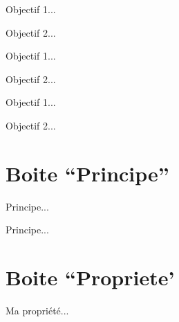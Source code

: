 \documentclass[a4paper,12pt]{article}
\begin{document}
\begin{objectifs}
	\item Objectif 1...
	\item Objectif 2...
\end{objectifs}%

\begin{code}%
\begin{objectifs*}
	\item Objectif 1...
	\item Objectif 2...
\end{objectifs*}
\end{code}

\begin{objectifs*}
	\item Objectif 1...
	\item Objectif 2...
\end{objectifs*}%




	\section{Boite ``Principe''}

\begin{code}%
\begin{principe}
	Principe...
\end{principe}
\end{code}

\begin{principe}
	Principe...
\end{principe}%





	\section{Boite ``Propriete'}

\begin{code}%
\begin{propriete}
	Ma propriété...
\end{propriete}
\end{code}
\end{document}
